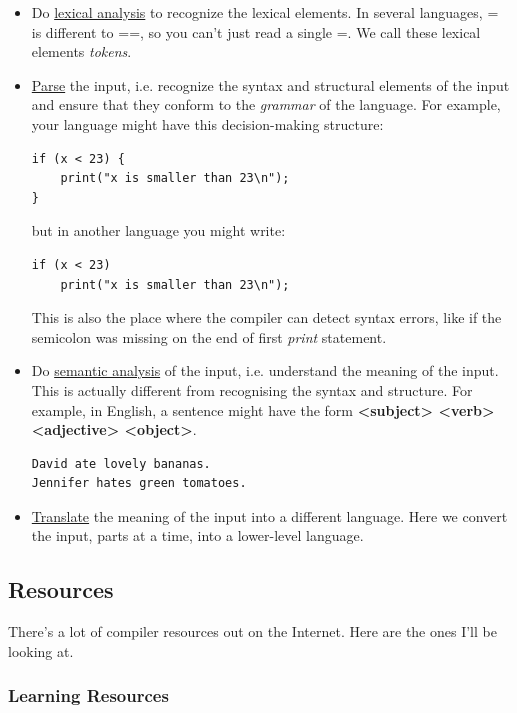 \documentclass[journal, onecolumn, 12pt]{IEEEtran}
\begin{document}
\begin{itemize}
    \item Do \href{https://en.wikipedia.org/wiki/Lexical_analysis}{lexical analysis} to recognize the lexical elements. In several languages, {\color{red}=} is different to {\color{red}==}, so you can't just read a single {\color{red}=}. We call these lexical elements \textit{tokens}.
    \item \href{https://en.wikipedia.org/wiki/Parsing}{Parse} the input, i.e. recognize the syntax and structural elements of the input and ensure that they conform to the \textit{grammar} of the language. For example, your language might have this decision-making structure:
    \begin{lstlisting}
if (x < 23) {
    print("x is smaller than 23\n");
}
    \end{lstlisting}
    but in another language you might write:
    \begin{lstlisting}
if (x < 23)
    print("x is smaller than 23\n");
    \end{lstlisting}
    This is also the place where the compiler can detect syntax errors, like if the semicolon was missing on the end of first \textit{print} statement.
    \item Do \href{https://en.wikipedia.org/wiki/Semantic_analysis_(compilers)}{semantic analysis} of the input, i.e. understand the meaning of the input. This is actually different from recognising the syntax and structure. For example, in English, a sentence might have the form \textbf{<subject> <verb> <adjective> <object>}.
    \begin{lstlisting}
David ate lovely bananas.
Jennifer hates green tomatoes.
    \end{lstlisting}
    \item \href{https://en.wikipedia.org/wiki/Code_generation_(compiler)}{Translate} the meaning of the input into a different language. Here we convert the input, parts at a time, into a lower-level language.
\end{itemize}

\subsection{Resources}

There's a lot of compiler resources out on the Internet. Here are the ones I'll be looking at.

\subsubsection{Learning Resources}
\end{document}
